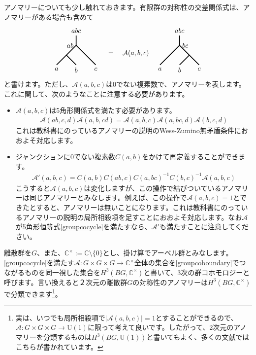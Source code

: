 \documentclass[report,paper=a4, fontsize=12pt, line_length=16cm, number_of_lines=33,dvipdfmx]{jlreq}
\numberwithin{equation}{chapter}
\newcommand{\Cb}{\mathbb{C}}
\newcommand{\U}{\mbox{U}}
\newcommand{\Acal}{\mathcal{A}}
\begin{document}
アノマリーについても少し触れておきます。有限群の対称性の交差関係式は、アノマリーがある場合も含めて
\begin{align}
  \begin{tikzpicture}[baseline=0]
      \draw[very thick](0,0)--(0.5,0.5) node [left]{$ab$};
      \draw[very thick](0,0)--(-0.5,-0.5) node[below]{$a$};
      \draw[very thick](0,0)--(0.5,-0.5) node[below]{$b$};
      \draw[very thick](0.5,0.5)--(1.5,-0.5) node[below]{$c$};
      \draw[very thick](0.5,0.5)--(0.5,1) node[above]{$abc$};
  \end{tikzpicture}
  \quad = \quad
  \Acal(a,b,c)\quad
  \begin{tikzpicture}[baseline=0]
      \draw[very thick](1,0)--(0.5,0.5) node [right]{$bc$};
      \draw[very thick](0.5,0.5)--(-0.5,-0.5) node[below]{$a$};
      \draw[very thick](1,0)--(0.5,-0.5) node[below]{$b$};
      \draw[very thick](1,0)--(1.5,-0.5) node[below]{$c$};
      \draw[very thick](0.5,0.5)--(0.5,1) node[above]{$abc$};
  \end{tikzpicture}
\end{align}
と書けます。ただし、$\Acal(a,b,c)$は$0$でない複素数で、アノマリーを表します。これに関して、次のようなことに注意する必要があります。
\begin{itemize}
  \item $\Acal(a,b,c)$は5角形関係式を満たす必要があります。
  \begin{align}
    \Acal(ab,c,d)
    \Acal(a,b,cd)
    =
    \Acal(a,b,c)
    \Acal(a,bc,d)
    \Acal(b,c,d)
    \label{groupcocycle}
  \end{align}
  これは教科書にのっているアノマリーの説明のWess-Zumino無矛盾条件におおよそ対応します。
  \item ジャンクションに$0$でない複素数$C(a,b)$をかけて再定義することができます。
  \begin{align}
    \Acal'(a,b,c)=C(a,b)C(ab,c)C(a,bc)^{-1}C(b,c)^{-1}\Acal(a,b,c)
    \label{groupcoboundary}
  \end{align}
  こうすると$\Acal(a,b,c)$は変化しますが、この操作で結びついているアノマリーは同じアノマリーとみなします。例えば、この操作で$\Acal(a,b,c)=1$とできたとすると、アノマリーは無いことになります。これは教科書にのっているアノマリーの説明の局所相殺項を足すことにおおよそ対応します。なお$\Acal$が5角形恒等式\eqref{groupcocycle}を満たすなら、$\Acal'$も満たすことに注意してください。
\end{itemize}
離散群を$G$、また、$\Cb^{\times}:=\Cb \setminus \{0\}$とし、掛け算でアーベル群とみなします。\eqref{groupcocycle}を満たす$\Acal: G\times G \times G\to \Cb^{\times}$全体の集合を\eqref{groupcoboundary}でつながるものを同一視した集合を$H^3(BG,\Cb^{\times})$と書いて、3次の群コホモロジーと呼びます。言い換えると２次元の離散群$G$の対称性のアノマリーは$H^3(BG,\Cb^{\times})$で分類できます\footnote{実は、いつでも局所相殺項で$|\Acal(a,b,c)|=1$とすることができるので、$\Acal: G\times G \times G\to \U(1)$に限って考えて良いです。したがって、2次元のアノマリーを分類するものは$H^3(BG,\U(1))$と書いてもよく、多くの文献ではこちらが書かれています。}。
\end{document}
